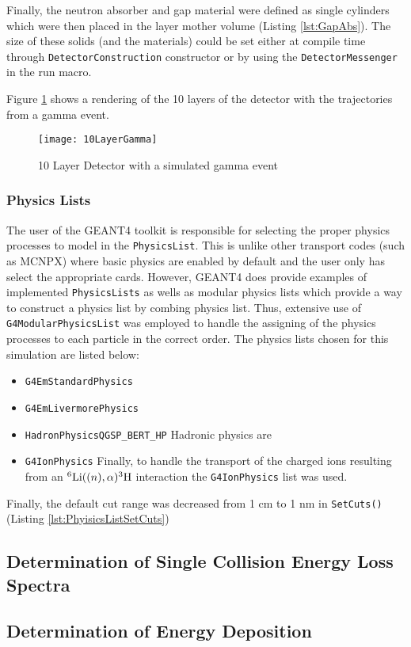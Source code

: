 Finally, the neutron absorber and gap material were defined as single cylinders which were then placed in the layer mother volume (Listing \ref{lst:GapAbs}).
The size of these solids (and the materials) could be set either at compile time through \verb+DetectorConstruction+ constructor or by using the \verb+DetectorMessenger+ in the run macro.

Figure \ref{fig:LayerDetectorGeo} shows a rendering of the 10 layers of the detector with the trajectories from a gamma event.
\begin{figure} 
    \texttt{[image: 10LayerGamma]}
	\caption{10 Layer Detector with a simulated gamma event}
    \label{fig:LayerDetectorGeo}
\end{figure}

\subsubsection{Physics Lists}
The user of the GEANT4 toolkit is responsible for selecting the proper physics processes to model in the \verb+PhysicsList+.
This is unlike other transport codes (such as MCNPX) where basic physics are enabled by default and the user only has select the appropriate cards.
However, GEANT4 does provide examples of implemented \verb+PhysicsLists+ as wells as modular physics lists which provide a way to construct a physics list by combing physics list.
Thus, extensive use of \verb+G4ModularPhysicsList+ was employed to handle the assigning of the physics processes to each particle in the correct order.
The physics lists chosen for this simulation are listed below:
\begin{itemize}
    \item \verb+G4EmStandardPhysics+
    \item \verb+G4EmLivermorePhysics+
    \item \verb+HadronPhysicsQGSP_BERT_HP+ Hadronic physics are
    \item \verb+G4IonPhysics+ Finally, to handle the transport of the charged ions resulting from an ${}^6\text{Li}(\text(n),\alpha){}^{3}\text{H}$ interaction the \verb+G4IonPhysics+ list was used.
\end{itemize}

Finally, the default cut range was decreased from 1 cm to 1 nm in \verb+SetCuts()+ (Listing \ref{lst:PhyisicsListSetCuts}) 



\subsection{Determination of Single Collision Energy Loss Spectra}

\subsection{Determination of Energy Deposition}

